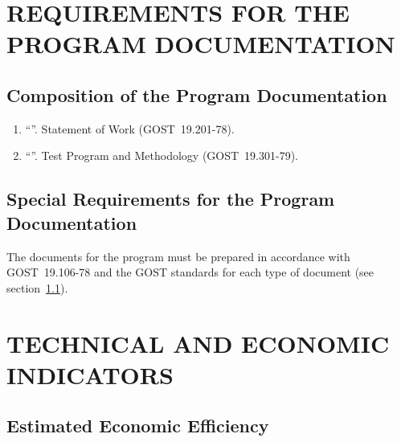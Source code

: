 \documentclass[12pt,a4paper]{extarticle}
\begin{document}
\clearpage

\section{REQUIREMENTS FOR THE PROGRAM DOCUMENTATION}

\subsection{Composition of the Program Documentation}
\label{sec:doc_composition}

\begin{enumerate}[label=\arabic*), leftmargin=1.25cm]
\item \enquote{\projectname}. Statement of Work (GOST~19.201-78).
\item \enquote{\projectname}. Test Program and Methodology (GOST~19.301-79).
\end{enumerate}

\subsection{Special Requirements for the Program Documentation}
\label{sec:doc_reqs}

The documents for the program must be prepared in accordance with GOST~19.106-78 and the GOST standards for each type of document (see section~\ref{sec:doc_composition}).

\clearpage

\section{TECHNICAL AND ECONOMIC INDICATORS}

\subsection{Estimated Economic Efficiency}
\end{document}
